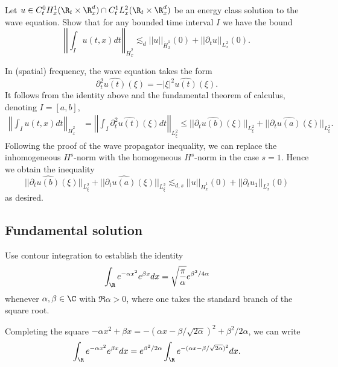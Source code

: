 \begin{statement}
	Let $u \in C^0_t H^1_x (\R_t \times \R_x^d) \cap C^1_t L^2_x (\R_t \times \R^d_x)$ be an energy class solution to the wave equation. Show that for any bounded time interval $I$ we have the bound
		\[ \left|\left| \int_I u(t, x) dt \right| \right|_{\dot H^2_x} \lesssim_d ||u||_{\dot H^1_x} (0) + ||\partial_t u ||_{L^2_x} (0).  \]
\end{statement}

\begin{solution}
	In (spatial) frequency, the wave equation takes the form
		\[ \partial_t^2 \widehat {u(t)} (\xi) = - |\xi|^2 \widehat{u(t)} (\xi). \]
	It follows from the identity above and the fundamental theorem of calculus, denoting $I = [a, b]$, 
		\begin{align*}
			\left|\left| \int_I u(t, x) dt \right| \right|_{\dot H^2_x}
				&=\left|\left|  \int_I \partial_t^2 \widehat{u(t)} (\xi) dt \right|\right|_{L^2_\xi} \leq ||\partial_t \widehat{u(b)} (\xi)||_{L^2_\xi} + ||\partial_t \widehat{u(a)} (\xi)||_{L^2_\xi}. 
		\end{align*}	
	Following the proof of the wave propagator inequality, we can replace the inhomogeneous $H^s$-norm with the homogeneous $H^s$-norm in the case $s = 1$. Hence we obtain the inequality
		\[ ||\partial_t \widehat{u(b)} (\xi)||_{L^2_\xi} + ||\partial_t \widehat{u(a)} (\xi)||_{L^2_\xi} \lesssim_{d, s} || u||_{\dot H^1_x} (0) + ||\partial_t u_1||_{L^2_x} (0) \] 	
	as desired. 	
\end{solution}

\subsection{Fundamental solution}

\begin{statement}
	Use contour integration to establish the identity
		\[ \int_\R e^{-\alpha x^2} e^{\beta x} dx = \sqrt{\frac\pi\alpha} e^{\beta^2/4 \alpha} \]
	whenever $\alpha, \beta \in \C$ with $\Re \alpha > 0$, where one takes the standard branch of the square root. 	
\end{statement}

\begin{solution}
	Completing the square $-\alpha x^2 + \beta x = -(\alpha x - \beta/\sqrt{2\alpha})^2 + \beta^2/2\alpha$, we can write
		\[ \int_\R e^{-\alpha x^2} e^{\beta x} dx = e^{\beta^2/2 \alpha}\int_\R e^{- (\alpha x - \beta/\sqrt{2 \alpha})^2} dx. \]
\end{solution}

